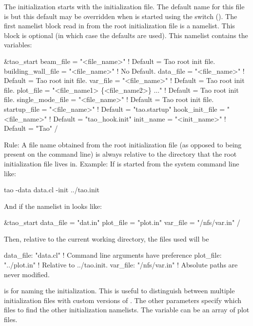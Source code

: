 The initialization starts with the  \tao initialization file. The default name for this
file is  but this default may be overridden when \tao is started using the 
switch (). The first namelist block read in from the root initialization file is a
 namelist. This block is optional (in which case the defaults are used).  This
namelist contains the variables:
\begin{example}
  &tao_start
    beam_file          = "<file_name>"  ! Default = Tao root init file.
    building_wall_file = "<file_name>"  ! No Default.
    data_file          = "<file_name>"  ! Default = Tao root init file.
    var_file           = "<file_name>"  ! Default = Tao root init file.
    plot_file          = "<file_name1> \{<file_name2>\} ..."  
                                        ! Default = Tao root init file.
    single_mode_file   = "<file_name>"  ! Default = Tao root init file.
    startup_file       = "<file_name>"  ! Default = "tao.startup"
    hook_init_file     = "<file_name>"  ! Default = "tao_hook.init"
    init_name          = "<init_name>"  ! Default = "Tao"
  /
\end{example}
Rule: A file name obtained from the \tao root initialization file (as opposed to being present on
the command line) is always relative to the directory that the \tao root initialization file lives
in. Example: If \tao is started from the system command line like:
\begin{example}
    tao -data data.cl -init ../tao.init
\end{example}
And if the  namelist in  looks like:
\begin{example}
  &tao_start
    data_file = "dat.in"
    plot_file = "plot.in"
    var_file  = "/nfs/var.in"
  /
\end{example}
Then, relative to the current working directory, the files used will be
\begin{example}
  data_file: "data.cl"      ! Command line arguments have preference
  plot_file: "../plot.in"   ! Relative to ../tao.init.
  var_file:  "/nfs/var.in"  ! Absolute paths are never modified.
\end{example}

 is for naming the initialization. This is useful to distinguish between multiple
initialization files with custom versions of \tao. The other parameters specify which files to find
the other initialization namelists. The  variable can be an array of plot files.

